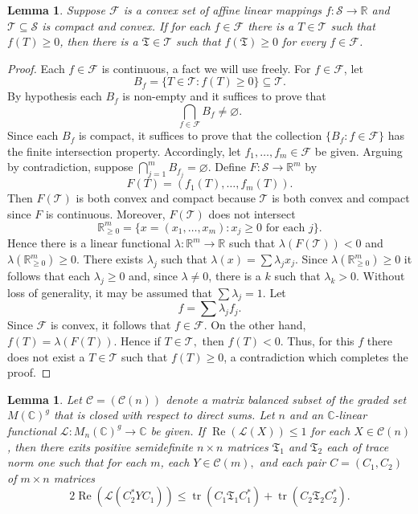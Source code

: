 \documentclass[12pt,makeidx]{amsart}
\renewcommand{\subset}{\subseteq}
\renewcommand{\emptyset}{\varnothing}
\DeclareMathOperator{\tr}{tr}
\newtheorem{lemma}[theorem]{Lemma}
\numberwithin{equation}{section}
\def\bbF{ {\mathbb C}}
\def\R{ {\mathbb{R}} }
\def\cC{ {\mathcal C} }
\def\cS{{\mathcal S} }
\def\cT{{\mathcal T}}
\def\mfT{\mathfrak{T}}
\def\cS{{\mathcal S}}
\def\Cr{C_1}
\def\Cl{C_2}
\def\hh{T}
\def\hhs{\mathfrak{T}}
\begin{document}
\begin{lemma}
 \label{lem:cone}
  Suppose $\mathcal F$ is a convex set of affine linear
  mappings $f:\cS \to \mathbb \R$ and $\cT\subset \cS$ is  compact and  convex.
  If for each $f\in \mathcal F$
  there is a $\hh \in\cT$ such that $f(\hh)\ge 0$,
  then there is a $\hhs\in \cT$ such that
  $f(\hhs)\ge 0$ for every $f\in\mathcal F$.
\end{lemma}

\begin{proof}
 Each $f\in \mathcal F$ is continuous, a fact we will use freely.  For $f\in\mathcal F$, let
 \[
   B_f =\{\hh\in \cT: f(\hh)\ge 0\}\subset \cT.
 \]
  By hypothesis each $B_f$ is non-empty and
  it suffices to prove that
 $$
   \bigcap_{f\in\mathcal F} B_f \neq \emptyset.
 $$
  Since each $B_f$ is compact, it suffices to
  prove that the collection $\{B_f: f\in\mathcal F\}$
  has the finite intersection property.  Accordingly,
  let $f_1,\dots,f_m\in\mathcal F$ be given. Arguing
  by contradiction, suppose
$
  \bigcap_{j=1}^m B_{f_j} =\emptyset.
$
Define $F:\cS \to \mathbb R^m$  by
\[
  F(\hh)=(f_1(\hh),\dots,f_m(\hh)).
\]
 Then $F(\cT)$ 
 is both convex and compact because $\cT$
 is both convex and compact since $F$ is continuous.
 Moreover, 
  $F(\cT)$  does not intersect 
 \[
   \mathbb R^m_{\geq0}=\{x=(x_1,\dots,x_m): x_j\ge 0 \mbox{ for each } j\}.
 \]
 Hence there is a linear functional $\lambda:\mathbb R^m \to \mathbb R$
 such that $\lambda(F(\cT))<0$ and $\lambda(\mathbb R_{\geq0}^m) \ge 0$.
 There exists $\lambda_j$ such that
$
 \lambda(x) = \sum \lambda_j x_j.
$
  Since $\lambda(\mathbb R^m_{\geq0}) \ge 0$ it follows that each
  $\lambda_j\ge 0$ and, since $\lambda\ne 0$, there is a $k$ such that $\lambda_k>0$.  Without loss of generality, 
  it may be assumed that $\sum \lambda_j=1$. 
  Let
\[
  f=\sum \lambda_j f_j.
\]
 Since $\mathcal F$ is convex, 
 it follows that $f\in\mathcal F$. On the other hand,
 $f(T)=\lambda(F(T)).$  Hence 
 if $T\in \cT,$ then  $f(T)<0$.
 Thus, for this $f$ there does not exist
 a $T\in \cT$ such that $f(T)\ge 0$,
 a contradiction which completes the proof.
\end{proof}



\begin{lemma}
 \label{lem:cT}
  Let $\cC=(\cC(n))$ denote a matrix balanced subset of
  the graded set $M(\bbF)^g$ that is closed with respect to direct sums.  Let $n$ and an $\bbF$-linear functional 
  $\mathcal L :M_n(\bbF)^g \to \bbF$ be given. 
  If 
   $
   \operatorname{Re}( \mathcal L (X)) \le 1
  $
   for each $X\in\cC(n)$,
  then there exits positive semidefinite  $n\times n$ matrices  $\mfT_1$ and $\mfT_2$ each of trace norm one
  such that   for each $m$, each $Y\in \cC(m),$ and each pair $C=(\Cr,\Cl)$ of 
  $m\times n$ matrices 
 \[
   2 \operatorname{Re}(\mathcal L (\Cl^{\ast} Y \Cr)) \le \tr(\Cr \mfT_1 \Cr^{\ast}) + \tr(\Cl\mfT_2 \Cl^\ast).
 \]
\end{lemma}
\end{document}
